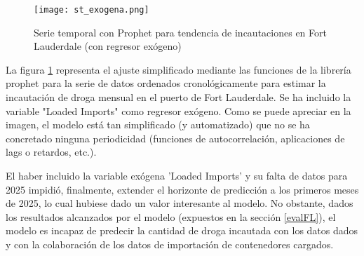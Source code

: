 \documentclass[12pt]{article}
\begin{document}
	\begin{figure}[H]
		\caption{\label{st_exogena} Serie temporal con Prophet para tendencia de incautaciones en Fort Lauderdale (con regresor exógeno)}
		\centering
		\hspace*{1cm}
		\texttt{[image: st\_exogena.png]}
	\end{figure}


	La figura \ref{st_exogena} representa el ajuste simplificado mediante las funciones de la librería prophet para la serie de datos ordenados cronológicamente para estimar la incautación de droga mensual en el puerto de Fort Lauderdale. Se ha incluido la variable "Loaded Imports" como regresor exógeno. Como se puede apreciar en la imagen, el modelo está tan simplificado (y automatizado) que no se ha concretado ninguna periodicidad (funciones de autocorrelación, aplicaciones de lags o retardos, etc.).
	
	El haber incluido la variable exógena 'Loaded Imports' y su falta de datos para 2025 impidió, finalmente, extender el horizonte de predicción a los primeros meses de 2025, lo cual hubiese dado un valor interesante al modelo. No obstante, dados los resultados alcanzados por el modelo (expuestos en la sección \ref{evalFL}), el modelo es incapaz de predecir la cantidad de droga incautada con los datos dados y con la colaboración de los datos de importación de contenedores cargados.
	
	
\end{document}
